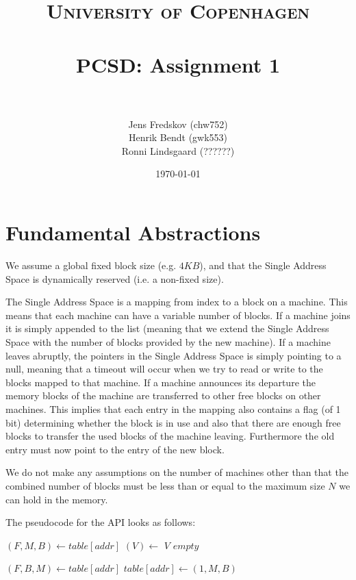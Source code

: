 \documentclass[a4paper, 11pt]{article}
\title{ 
\normalfont \normalsize 
\textsc{University of Copenhagen} \\ [25pt]
\horrule{0.5pt} \\[0.4cm]
\huge PCSD: Assignment 1 \\
\horrule{2pt} \\[0.5cm]
}
\author{Jens Fredskov (chw752)\\Henrik Bendt (gwk553)\\Ronni Lindsgaard (??????)} %
\date{\normalsize\today} %
\begin{document}
\maketitle

\section{Fundamental Abstractions} %
\label{sec:fundamental_abstractions}

We assume a global fixed block size (e.g. $4KB$), and that the Single Address Space is dynamically reserved (i.e. a non-fixed size).

The Single Address Space is a mapping from index to a block on a machine. This means that each machine can have a variable number of blocks. If a machine joins it is simply appended to the list (meaning that we extend the Single Address Space with the number of blocks provided by the new machine). If a machine leaves abruptly, the pointers in the Single Address Space is simply pointing to a null, meaning that a timeout will occur when we try to read or write to the blocks mapped to that machine. If a machine announces its departure the memory blocks of the machine are transferred to other free blocks on other machines. This implies that each entry in the mapping also contains a flag (of 1 bit) determining whether the block is in use and also that there are enough free blocks to transfer the used blocks of the machine leaving. Furthermore the old entry must now point to the entry of the new block.

We do not make any assumptions on the number of machines other than that the combined number of blocks must be less than or equal to the maximum size $N$ we can hold in the memory.

The pseudocode for the API looks as follows:

\begin{algorithmic}
    \State $(F, M, B) \gets table[addr]$
        \State $(V) \gets$ 
        \State \Return $V$
    \Else
        \State \Return $empty$
    \EndIf
\EndFunction
\end{algorithmic}

\begin{algorithmic}
    \State $(F, B, M) \gets table[addr]$
    \State {}
    \State $table[addr] \gets (1, M, B)$
\EndFunction
\end{algorithmic}
\end{document}
